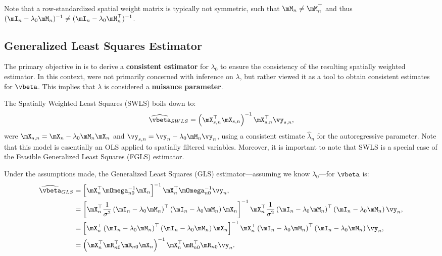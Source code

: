 \documentclass[english,12pt]{book}\usepackage[]{graphicx}\usepackage[]{xcolor}
\begin{document}
Note that a row-standardized spatial weight matrix is typically not symmetric, such that $\mM_n\neq \mM_n^\top$ and thus $(\mI_n - \lambda_0\mM_n)^{-1}\neq (\mI_n - \lambda_0\mM_n^\top)^{-1}$.

\subsection{Generalized Least Squares Estimator}\label{sec:swls}

The primary objective in \cite{kelejian1999generalized} is to derive a \textbf{consistent estimator} for  $\lambda_0$ to ensure the consistency of the resulting spatially weighted estimator. In this context, \cite{kelejian1999generalized} were not primarily concerned with inference on $\lambda$, but rather viewed it as a tool to obtain consistent estimates for $\vbeta$. This implies that $\lambda$ is considered a \textbf{nuisance parameter}. 

The Spatially Weighted Least Squares (SWLS) boils down to:
\begin{equation}\label{eq:beta_swls}
  \widehat{\vbeta}_{SWLS} = \left(\mX_{s, n}^\top\mX_{s, n}\right)^{-1}\mX_{s, n}^\top\vy_{s, n},
\end{equation}
%
were $\mX_{s, n} = \mX_n - \lambda_0\mM_n\mX_n$ and $\vy_{s, n} = \vy_n - \lambda_0\mM_n\vy_n$, using a consistent estimate $\widehat{\lambda}_n$ for the autoregressive parameter. Note that this model is essentially an OLS applied to spatially filtered variables. Moreover, it is important to note that SWLS is a special case of the Feasible Generalized Least Squares (FGLS) estimator. 

Under the assumptions made, the Generalized Least Squares (GLS) estimator---assuming we know $\lambda_0$---for $\vbeta$ is:
\begin{equation*}
\begin{aligned}
\widehat{\vbeta}_{GLS}  & = \left[\mX^\top_n\mOmega^{-1}_{n0}\mX_n\right]^{-1}\mX^\top_n\mOmega^{-1}_{n0}\vy_n, \\
& = \left[\mX^\top_n\frac{1}{\sigma^2}\left(\mI_n - \lambda_0\mM_n\right)^\top\left(\mI_n - \lambda_0\mM_n\right)\mX_n\right]^{-1}\mX^\top_n\frac{1}{\sigma^2}\left(\mI_n -\lambda_0\mM_n\right)^\top\left(\mI_n - \lambda_0\mM_n\right)\vy_n,  \\
   & =\left[\mX^\top_n\left(\mI_n - \lambda_0\mM_n\right)^\top\left(\mI_n - \lambda_0\mM_n\right)\mX_n\right]^{-1}\mX^\top_n\left(\mI_n -\lambda_0\mM_n\right)^\top\left(\mI_n - \lambda_0\mM_n\right)\vy_n, \\
  & =\left(\mX_n^\top \mR_{n0}^\top\mR_{n0}\mX_n\right)^{-1} \mX_n^\top \mR_{n0}^\top\mR_{n0}\vy_n. 
\end{aligned}
\end{equation*}
\end{document}
